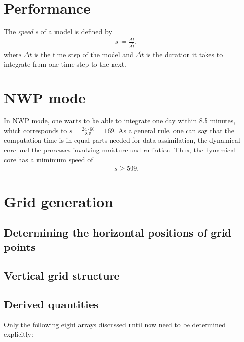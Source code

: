 \documentclass[10pt]{report}
\begin{document}
\chapter{Performance}
\label{chap:performance}

The \textit{speed} $s$ of a model is defined by
%
\begin{eqnarray}
s \coloneqq \frac{\Delta t}{\Delta\tilde{t}},
\end{eqnarray}
%
where $\Delta t$ is the time step of the model and $\Delta\tilde{t}$ is the duration it takes to integrate from one time step to the next.

\chapter{NWP mode}
\label{chap:nwp_mode}

In NWP mode, one wants to be able to integrate one day within 8.5 minutes, which corresponds to $s = \frac{24\cdot 60}{8.5} = 169$. As a general rule, one can say that the computation time is in equal parts needed for data assimilation, the dynamical core and the processes involving moisture and radiation. Thus, the dynamical core has a mimimum speed of
%
\begin{eqnarray}
s \geq 509.
\end{eqnarray}

\chapter{Grid generation}
\label{chap:grid_generation}

\section{Determining the horizontal positions of grid points}
\label{sec:determining_the_horizontal_positions_of_grid_points}

\section{Vertical grid structure}
\label{sec:vertical_grid_structure}

\section{Derived quantities}
\label{sec:derived_quantities}

Only the following eight arrays discussed until now need to be determined explicitly:
\end{document}
